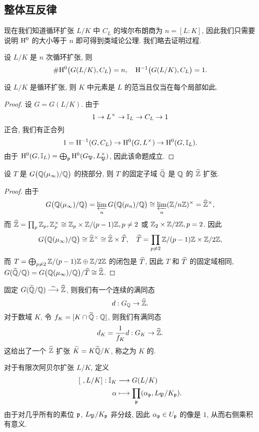 \subsection{整体互反律}
现在我们知道循环扩张 $L/K$ 中 $C_L$ 的埃尔布朗商为 $n=[L:K]$, 因此我们只需要说明 $\rmH^0$ 的大小等于 $n$ 即可得到类域论公理. 我们略去证明过程.
\begin{theorem}{}{}
设 $L/K$ 是 $n$ 次循环扩张, 则
  \[\#\rmH^0\bigl(G(L/K),C_L\bigr)=n,\quad \rmH^{-1}\bigl(G(L/K),C_L\bigr)=1.\]
\end{theorem}
\begin{corollary}{}{}
设 $L/K$ 是循环扩张, 则 $K$ 中元素是 $L$ 的范当且仅当在每个局部如此.
\end{corollary}
\begin{proof}
设 $G=G(L/K)$.
由于
  \[1\ra L^\times\ra \BI_L\ra C_L\ra 1\]
正合, 我们有正合列
  \[1=\rmH^{-1}(G,C_L)\ra \rmH^0(G,L^\times)\ra \rmH^0(G,\BI_L).\]
由于 $\rmH^0(G,\BI_L)=\bigoplus_\fp \rmH^0(G_\fP,L_\fP^\times)$, 因此该命题成立.
\end{proof}

\begin{proposition}{}{}
设 $T$ 是 $G\bigl(\BQ(\mu_\infty)/\BQ\bigr)$ 的挠部分, 则 $T$ 的固定子域 $\wt\BQ$ 是 $\BQ$ 的 $\wh \BZ$ 扩张. 
\end{proposition}
\begin{proof}
由于
  \[G\bigl(\BQ(\mu_\infty)/\BQ\bigr)=\plim_n G\bigl(\BQ(\mu_n)/\BQ\bigr)\cong \plim_n (\BZ/n\BZ)^\times=\wh \BZ^\times,\]
而 $\wh \BZ=\prod_p \BZ_p,\BZ_p^\times\cong \BZ_p\times \BZ/(p-1)\BZ,p\neq 2$ 或 $\BZ_2\times \BZ/2\BZ,p=2$. 因此
  \[G\bigl(\BQ(\mu_\infty)/\BQ\bigr)\cong\wh \BZ^\times\cong \wh \BZ\times\wh T,\quad \wh T=\prod_{p\neq 2}\BZ/(p-1)\BZ\times \BZ/2\BZ,\]
而 $T=\bigoplus_{p\neq 2} \BZ/(p-1)\BZ\oplus \BZ/2\BZ$ 的闭包是 $\wh T$, 因此 $T$ 和 $\wh T$ 的固定域相同, $G(\wt \BQ/\BQ)=G\bigl(\BQ(\mu_\infty)/\BQ\bigr)/\wh T\cong \wh \BZ$.
\end{proof}

固定 $G(\wt \BQ/\BQ)\simto \wh\BZ$, 则我们有一个连续的满同态
  \[d:G_\BQ\to\wh \BZ.\]
对于数域 $K$, 令 $f_K=[K\cap \wt \BQ:\BQ]$, 则我们有满同态
  \[d_K=\frac{1}{f_K}d:G_K\to \wh\BZ.\]
这给出了一个 $\wh\BZ$ 扩张 $\wt K=K\wt\BQ/K$, 称之为 $K$ 的.

对于有限次阿贝尔扩张 $L/K$, 定义
  \[\fct{[~,L/K]:\BI_K}{G(L/K)}{\alpha}{\prod_\fp(\alpha_\fp,L_\fP/K_\fp).}\]
由于对几乎所有的素位 $\fp$, $L_\fP/K_\fp$ 非分歧, 因此 $\alpha_\fp\in U_\fp$ 的像是 $1$, 从而右侧乘积有意义.

